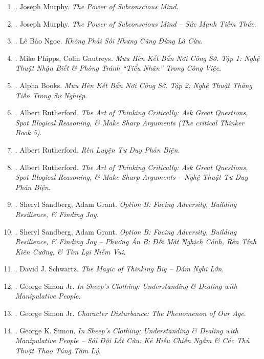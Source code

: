 \documentclass{article}
\begin{document}
\begin{enumerate}
	\item \cite{Murphy2011}. Joseph Murphy. \textit{The Power of Subconscious Mind}.\hfill{\sf[reading]}
	\item \cite{Murphy2021}. Joseph Murphy. \textit{The Power of Subconscious Mind -- Sức Mạnh Tiềm Thức}.\hfill{\sf[done]}
	\item \cite{Ngoc2022}. Lê Bảo Ngọc. \textit{Không Phải Sói Nhưng Cũng Đừng Là Cừu}.\hfill{\sf[done]}
	\item \cite{Phipps_Gautreys_muu_hen_ke_ban_tap_1}. Mike Phipps, Colin Gautreys. \textit{Mưu Hèn Kết Bẩn Nơi Công Sở. Tập 1: Nghệ Thuật Nhận Biết \& Phòng Tránh ``Tiểu Nhân'' Trong Công Việc}.\hfill{\sf[done]}
	\item \cite{muu_hen_ke_ban_tap_2}. Alpha Books. \textit{Mưu Hèn Kết Bẩn Nơi Công Sở. Tập 2: Nghệ Thuật Thăng Tiến Trong Sự Nghiệp}.\hfill{\sf[done]}
	\item \cite{Rutherford2020}. Albert Rutherford. \textit{The Art of Thinking Critically: Ask Great Questions, Spot Illogical Reasoning, \& Make Sharp Arguments (The critical Thinker Book 5)}.\hfill{\sf[reading]}
	\item \cite{Rutherford2022}. Albert Rutherford. \textit{Rèn Luyện Tư Duy Phản Biện}.\hfill{\sf[done]}
	\item \cite{Rutherford2023}. Albert Rutherford. \textit{The Art of Thinking Critically: Ask Great Questions, Spot Illogical Reasoning, \& Make Sharp Arguments -- Nghệ Thuật Tư Duy Phản Biện}.\hfill{\sf[done]}
	\item \cite{Sandberg_Grant2017}. Sheryl Sandberg, Adam Grant. \textit{Option B: Facing Adversity, Building Resilience, \& Finding Joy}.\hfill{\sf[reading]}
	\item \cite{Sandberg_Grant2019}. Sheryl Sandberg, Adam Grant. \textit{Option B: Facing Adversity, Building Resilience, \& Finding Joy -- Phương Án B: Đối Mặt Nghịch Cảnh, Rèn Tính Kiên Cường, \& Tìm Lại Niềm Vui}.\hfill{\sf[done]}
	\item \cite{Schwartz2019}. David J. Schwartz. \textit{The Magic of Thinking Big -- Dám Nghĩ Lớn}.\hfill{\sf[done]}
	\item \cite{Simon2010}. George Simon Jr. \textit{In Sheep's Clothing: Understanding \& Dealing with Manipulative People}.\hfill{\sf[reading]}
	\item \cite{Simon2011}. George Simon Jr. \textit{Character Disturbance: The Phenomenon of Our Age}.\hfill{\sf[done]}
	\item \cite{Simon2022}. George K. Simon. \textit{In Sheep's Clothing: Understanding \& Dealing with Manipulative People -- Sói Đội Lốt Cừu: Kẻ Hiếu Chiến Ngầm \& Các Thủ Thuật Thao Túng Tâm Lý}.\hfill{\sf[done]}

\end{enumerate}
\end{document}
